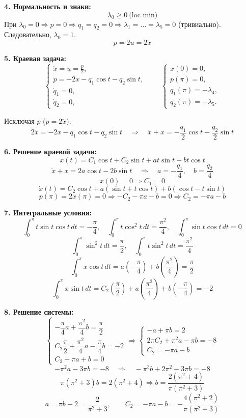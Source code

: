 \documentclass[12pt,a4paper]{article}
\begin{document}
\noindent
\textbf{4. Нормальность и знаки:}
\[
\lambda_0 \ge 0 \ \text{(loc min)}
\]
При \(\lambda_0=0 \Rightarrow p=0 \Rightarrow q_1=q_2=0 \Rightarrow \lambda_1=\dots=\lambda_5=0\) (тривиально). Следовательно, \(\lambda_0 = 1\).
\[
p = 2u = 2\dot{x}
\]

\vspace{0.3cm}
\noindent
\textbf{5. Краевая задача:}
\[
\begin{cases}
\dot{x} = u = \frac{p}{2}, \\[1mm]
\dot{p} = -2x - q_1 \cos t - q_2 \sin t, \\[1mm]
\dot{q}_1 = 0, \\[1mm]
\dot{q}_2 = 0,
\end{cases}
\qquad
\begin{cases}
x(0) = 0, \\[1mm]
p(\pi) = 0, \\[1mm]
q_1(\pi) = -\lambda_4, \\[1mm]
q_2(\pi) = -\lambda_5.
\end{cases}
\]

Исключая \(p\) (\(\dot{p} = 2\ddot{x}\)):
\[
2\ddot{x} = -2x - q_1 \cos t - q_2 \sin t \quad \Rightarrow \quad \ddot{x} + x = -\frac{q_1}{2} \cos t - \frac{q_2}{2} \sin t
\]

\noindent
\textbf{6. Решение краевой задачи:}
\[
x(t) = C_1 \cos t + C_2 \sin t + a t \sin t + b t \cos t
\]
\[
\ddot{x} + x = 2a \cos t - 2b \sin t \quad \Rightarrow \quad a = -\frac{q_1}{4}, \quad b = \frac{q_2}{4}
\]
\[
x(0) = 0 \Rightarrow C_1 = 0
\]
\[
\dot{x}(t) = C_2 \cos t + a(\sin t + t \cos t) + b(\cos t - t \sin t)
\]
\[
p(\pi) = 2\dot{x}(\pi) = 0 \Rightarrow -C_2 - \pi a - b = 0 \Rightarrow C_2 = -\pi a - b
\]

\noindent
\textbf{7. Интегральные условия:}
\[
\int_0^\pi t \sin t \cos t \, dt = -\frac{\pi}{4}, \quad \int_0^\pi t \cos^2 t \, dt = \frac{\pi^2}{4}, \quad \int_0^\pi \sin t \cos t \, dt = 0
\]
\[
\int_0^\pi \sin^2 t \, dt = \frac{\pi}{2}, \quad \int_0^\pi t \sin^2 t \, dt = \frac{\pi^2}{4}
\]
\[
\int_0^\pi x \cos t \, dt = a\left(-\frac{\pi}{4}\right) + b\left(\frac{\pi^2}{4}\right) = \frac{\pi}{2}
\]
\[
\int_0^\pi x \sin t \, dt = C_2\left(\frac{\pi}{2}\right) + a\left(\frac{\pi^2}{4}\right) + b\left(-\frac{\pi}{4}\right) = -2
\]

\noindent
\textbf{8. Решение системы:}
\[
\begin{cases} 
-\dfrac{\pi}{4}a + \dfrac{\pi^2}{4}b = \dfrac{\pi}{2} \\[2mm]
C_2\dfrac{\pi}{2} + \dfrac{\pi^2}{4}a - \dfrac{\pi}{4}b = -2 \\[2mm]
C_2 + \pi a + b = 0 
\end{cases}
\Rightarrow
\begin{cases} 
-a + \pi b = 2 \\[1mm]
2\pi C_2 + \pi^2 a - \pi b = -8 \\[1mm]
C_2 = -\pi a - b 
\end{cases}
\]
\[
-\pi^2 a - 3\pi b = -8 \quad \Rightarrow \quad -\pi^3 b + 2\pi^2 - 3\pi b = -8
\]
\[
\pi(\pi^2 + 3)b = 2(\pi^2 + 4) \Rightarrow b = \frac{2(\pi^2 + 4)}{\pi(\pi^2 + 3)}
\]
\[
a = \pi b - 2 = \frac{2}{\pi^2 + 3}, \qquad C_2 = -\pi a - b = -\frac{4(\pi^2 + 2)}{\pi(\pi^2 + 3)}
\]
\end{document}
